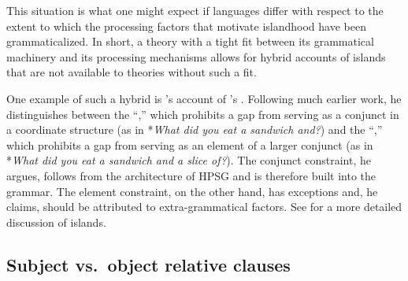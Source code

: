 \documentclass[a4paper]{article}
\begin{document}
This situation is what one might expect if languages differ with respect to the extent to which the processing factors that motivate islandhood have been grammaticalized.  In short, a theory with a tight fit between its grammatical machinery and its processing mechanisms allows for hybrid accounts of islands that are not available to theories without such a fit.

One example of such a hybrid is \citeauthor{Chaves2012}'s \citeyearpar{Chaves2012} account of \citeauthor{Ross67}'s .  Following much earlier work, he distinguishes between the ``,'' which prohibits a gap from serving as a conjunct in a coordinate structure (as in *\emph{What did you eat a sandwich and?}) and the ``,'' which prohibits a gap from serving as an element of a larger conjunct (as in *\emph{What did you eat a sandwich and a slice of?}).  The conjunct constraint, he argues, follows from the architecture of HPSG and is therefore built into the grammar.  The element constraint, on the other hand, has exceptions and, he claims, should be attributed to extra-grammatical factors.  See  for a more detailed discussion of islands. 


\subsection{Subject vs.\ object relative clauses}
\end{document}
